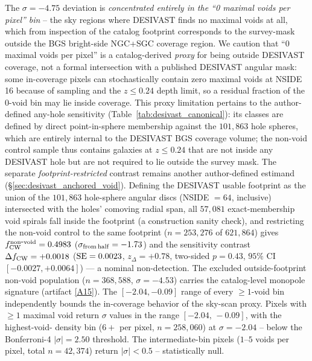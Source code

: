 \documentclass[twocolumn,linenumbers]{aastex702}
\newcommand{\repoBase}{https://github.com/Hubify-Projects/bigbounce/blob/main}
\begin{document}
The $\sigma = -4.75$ deviation is \emph{concentrated entirely in the
``0 maximal voids per pixel'' bin} -- the sky regions where DESIVAST
finds no maximal voids at all, which from inspection of the catalog
footprint corresponds to the survey-mask outside the BGS bright-side
NGC+SGC coverage region. We caution that ``$0$ maximal voids per
pixel'' is a catalog-derived \emph{proxy} for being outside DESIVAST
coverage, not a formal intersection with a published DESIVAST angular
mask: some in-coverage pixels can stochastically contain zero maximal
voids at NSIDE\,16 because of sampling and the $z \leq 0.24$ depth
limit, so a residual fraction of the $0$-void bin may lie inside
coverage. This proxy limitation pertains to the author-defined
any-hole sensitivity (Table~\ref{tab:desivast_canonical}): its classes are
defined by direct point-in-sphere membership against the $101{,}863$
hole spheres, which are entirely internal to the DESIVAST BGS coverage
volume; the non-void control sample thus contains galaxies at
$z \leq 0.24$ that are not inside any DESIVAST hole but are not
required to lie outside the survey mask. The separate
\emph{footprint-restricted} contrast remains another author-defined
estimand (\S\ref{sec:desivast_anchored_void}). Defining the DESIVAST usable
footprint as the union of the $101{,}863$ hole-sphere angular discs
(NSIDE $= 64$, inclusive) intersected with the holes' comoving radial
span, all $57{,}081$ exact-membership void spirals fall inside the
footprint (a construction sanity check), and restricting the non-void
control to the same footprint ($n = 253{,}276$ of $621{,}864$) gives
$f_{\rm CW}^{\rm non\mbox{-}void} = 0.4983$ ($\sigma_{\rm from\,half} =
-1.73$) and the sensitivity contrast $\Delta f_{\rm CW} = +0.0018$
(${\rm SE} = 0.0023$, $z_\Delta = +0.78$, two-sided $p = 0.43$,
$95\%$ CI $[-0.0027, +0.0064]$) --- a nominal non-detection. The excluded
outside-footprint non-void population ($n = 368{,}588$,
$\sigma = -4.53$) carries the catalog-level monopole signature
(artifact
\href{\repoBase/pipelines/p5\_desi\_chirality/outputs/29\_ext3\_desivast\_footprint\_retabulation.json}{[A15]}).
The $[-2.04, -0.09]$ range of every $\geq\!1$-void bin independently bounds
the in-coverage behavior of the sky-scan proxy. Pixels with $\geq 1$ maximal void return
$\sigma$ values in the range $[-2.04,\,-0.09]$, with the highest-void-
density bin ($6+$ per pixel, $n = 258{,}060$) at $\sigma = -2.04$ --
below the Bonferroni-4 $|\sigma| = 2.50$ threshold. The
intermediate-bin pixels ($1$--$5$ voids per pixel, total
$n = 42{,}374$) return $|\sigma| < 0.5$ -- statistically null.
\end{document}
